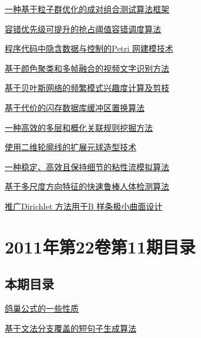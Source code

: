 \documentclass[a4paper]{article}
\begin{document}
\href{http://www.jos.org.cn/ch/reader/download_pdf.aspx?file_no=3973&year_id=2011&quarter_id=12&falg=1}{一种基于粒子群优化的成对组合测试算法框架}

\href{http://www.jos.org.cn/ch/reader/download_pdf.aspx?file_no=3955&year_id=2011&quarter_id=12&falg=1}{容错优先级可提升的抢占阈值容错调度算法}

\href{http://www.jos.org.cn/ch/reader/download_pdf.aspx?file_no=3956&year_id=2011&quarter_id=12&falg=1}{程序代码中隐含数据与控制的Petri 网建模技术}

\href{http://www.jos.org.cn/ch/reader/download_pdf.aspx?file_no=3970&year_id=2011&quarter_id=12&falg=1}{基于颜色聚类和多帧融合的视频文字识别方法}

\href{http://www.jos.org.cn/ch/reader/download_pdf.aspx?file_no=3978&year_id=2011&quarter_id=12&falg=1}{基于贝叶斯网络的频繁模式兴趣度计算及剪枝}

\href{http://www.jos.org.cn/ch/reader/download_pdf.aspx?file_no=3967&year_id=2011&quarter_id=12&falg=1}{基于代价的闪存数据库缓冲区置换算法}

\href{http://www.jos.org.cn/ch/reader/download_pdf.aspx?file_no=3907&year_id=2011&quarter_id=12&falg=1}{一种高效的多层和概化关联规则挖掘方法}

\href{http://www.jos.org.cn/ch/reader/download_pdf.aspx?file_no=3943&year_id=2011&quarter_id=12&falg=1}{使用二维轮廓线的扩展元球造型技术}

\href{http://www.jos.org.cn/ch/reader/download_pdf.aspx?file_no=3976&year_id=2011&quarter_id=12&falg=1}{一种稳定、高效且保持细节的粘性流模拟算法}

\href{http://www.jos.org.cn/ch/reader/download_pdf.aspx?file_no=3987&year_id=2011&quarter_id=12&falg=1}{基于多尺度方向特征的快速鲁棒人体检测算法}

\href{http://www.jos.org.cn/ch/reader/download_pdf.aspx?file_no=4009&year_id=2011&quarter_id=12&falg=1}{推广Dirichlet 方法用于B 样条极小曲面设计}


\section{\textbf{2011年第22卷第11期目录}}
\subsection{本期目录}
\href{http://www.jos.org.cn/ch/reader/download_pdf.aspx?file_no=3957&year_id=2011&quarter_id=11&falg=1}{鸽巢公式的一些性质}

\href{http://www.jos.org.cn/ch/reader/download_pdf.aspx?file_no=3964&year_id=2011&quarter_id=11&falg=1}{基于文法分支覆盖的短句子生成算法}
\end{document}

